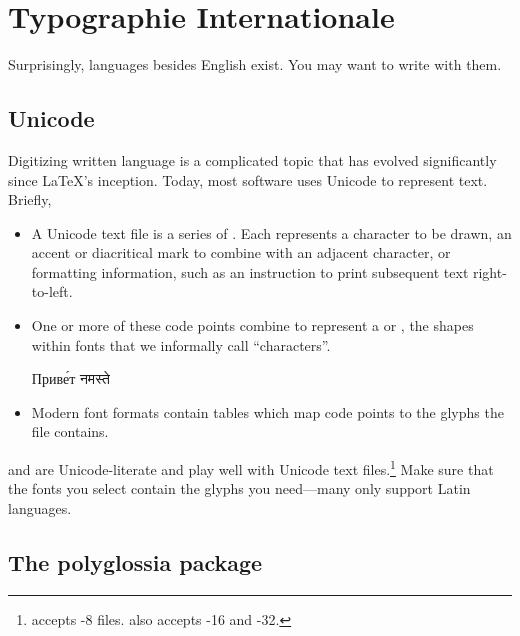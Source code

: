 \chapter{Typographie Internationale}
\label{i18n}

Surprisingly, languages besides English exist.
You may want to write with them.

\section{Unicode}

Digitizing written language is a complicated topic that has evolved significantly
since \LaTeX's inception.
Today, most software uses Unicode to represent text. Briefly,
\begin{itemize}
\item A Unicode text file is a series of .
    Each represents a character to be drawn,
    an accent or diacritical mark to combine with an adjacent
    character,
    or formatting information,
    such as an instruction to print subsequent text right-to-left.
\item One or more of these code points combine to represent a
     or ,
    the shapes within fonts that we informally call ``characters''\quotekern.
\begin{centerfigure}
\large%
%
Приве́т
\quad{}%
नमस्ते
\end{centerfigure}
\item Modern font formats contain tables
    which map code points to the glyphs the file contains.
\end{itemize}
\LuaLaTeX{} and \XeLaTeX{} are Unicode-literate and play well with
Unicode text
files.\punckern\footnote{\LuaLaTeX{} accepts \mbox{-8} files.
\XeLaTeX{} also accepts \mbox{-16} and \mbox{-32}.}
Make sure that the fonts you select contain the glyphs you need---many
only support Latin languages.

\section{The polyglossia package}

